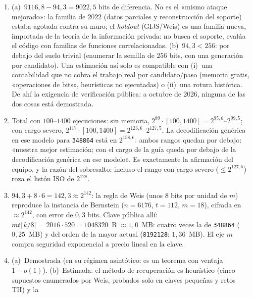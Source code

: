 \documentclass[11pt,a4paper,oneside]{report}
\begin{document}
\begin{enumerate}[leftmargin=1.9em,itemsep=4pt]
  \item (a)~$9116{,}8-94{,}3=9022{,}5$ bits de diferencia. No es el
        «mismo ataque mejorado»: la familia de 2022 (datos
        parciales y reconstrucción del soporte) estaba agotada
        contra su muro; el \emph{holdout} (GIJS/Weis) es una
        familia nueva, importada de la teoría de la información
        privada: no busca el soporte, evalúa el código con familias
        de funciones correlacionadas. (b)~$94{,}3<256$: por debajo
        del suelo trivial (enumerar la semilla de $256$ bits, con
        una generación por candidato). Una estimación así solo es
        compatible con (i)~una contabilidad que no cobra el trabajo
        real por candidato/paso (memoria gratis, «operaciones de
        bits», heurísticas no ejecutadas) o (ii)~una rotura
        histórica. De ahí la exigencia de verificación pública: a
        octubre de 2026, ninguna de las dos cosas está demostrada.
  \item Total con $100$--$1400$ ejecuciones: sin memoria,
        $2^{89}\cdot[100,1400]=2^{95{,}6}$--$2^{99{,}5}$; con cargo
        severo, $2^{117}\cdot[100,1400]=2^{123{,}6}$--$2^{127{,}5}$.
        La decodificación genérica en ese modelo para
        \texttt{348864} está en $2^{158{,}6}$: ambos rangos quedan
        por debajo: «nuestra mejor estimación; con el cargo de la
        guía queda por debajo de la decodificación genérica en ese
        modelo». Es exactamente la afirmación del equipo, y la
        razón del sobresalto: incluso el rango con cargo severo
        ($\le2^{127{,}5}$) roza el listón ISO de $2^{128}$.
  \item $94{,}3+8\cdot6=142{,}3\approx2^{142}$: la regla de Weis
        (unos $8$ bits por unidad de $m$) reproduce la instancia de
        Bernstein ($n=6176$, $t=112$, $m=18$), cifrada en
        $\approx2^{142}$, con error de $0{,}3$ bits. Clave pública
        allí: $mt\lceil k/8\rceil=2016\cdot520=\num{1048320}$~B
        $\approx1{,}0$~MB: cuatro veces la de \texttt{348864}
        ($0{,}25$~MB) y del orden de la mayor actual
        (\texttt{8192128}: $1{,}36$~MB). El eje $m$ compra
        seguridad exponencial a precio lineal en la clave.
  \item (a)~Demostrada (en su régimen asintótico: es un teorema
        con ventaja $1-o(1)$). (b)~Estimada: el método de
        recuperación es heurístico (cinco supuestos enumerados por
        Weis, probados solo en claves pequeñas y retos TII) y la

\end{enumerate}
\end{document}
